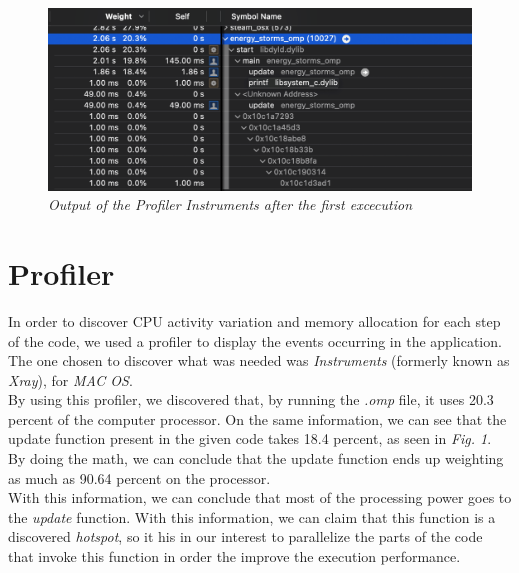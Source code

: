 \documentclass[10pt,journal,compsoc]{IEEEtran}
\begin{document}
\begin{figure}[b]
    \centering
    \includegraphics[scale=0.4]{profiler_data.png}
    \caption{\itshape{Output of the Profiler Instruments after the first excecution}}
    \label{fig:my_label}
\end{figure}

\section{Profiler}

In order to discover CPU activity variation and memory allocation for each step of the code, we used a profiler to display the events occurring in the application. The one chosen to discover what was needed was {\itshape Instruments} (formerly known as {\itshape Xray}), for {\itshape MAC OS}.\cite{Prof}
\\By using this profiler, we discovered that, by running the {\itshape .omp} file, it uses 20.3 percent of the computer processor. On the same information, we can see that the update function present in the given code takes 18.4 percent, as seen in {\itshape Fig. 1}. By doing the math, we can conclude that the update function ends up weighting as much as 90.64 percent on the processor.
\\With this information, we can conclude that most of the processing power goes to the {\itshape update} function. With this information, we can claim that this function is a discovered {\itshape hotspot}, so it his in our interest to parallelize the parts of the code that invoke this function in order the improve the execution performance.
\end{document}
